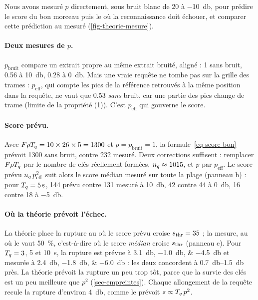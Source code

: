 Nous avons mesuré $p$ directement, sous bruit blanc de 20 à \qty{-10}{\decibel}, pour
prédire le score du bon morceau puis le \RSB{} où la reconnaissance doit échouer, et comparer
cette prédiction au \TBD{} mesuré (\cref{fig-theorie-mesure}).

\paragraph{Deux mesures de $p$.} $p_{\text{bruit}}$ compare un extrait propre au même extrait
bruité, aligné : 1 sans bruit, \num{0.56} à \qty{10}{\decibel}, \num{0.28} à \qty{0}{\decibel}.
Mais une vraie requête ne tombe pas sur la grille des trames : $p_{\text{eff}}$, qui compte
les pics de la référence retrouvés à la même position dans la requête, ne vaut que
\num{0.53} \emph{sans} bruit, car une partie des pics change de trame (limite de la
propriété (1)). C'est $p_{\text{eff}}$ qui gouverne le score.

\paragraph{Score prévu.} Avec $F\rho T_q = 10 \times 26 \times 5 = \num{1300}$ et
$p = p_{\text{bruit}} = 1$, la formule~\eqref{eq-score-bon} prévoit \num{1300} sans bruit,
contre 232 mesuré. Deux corrections suffisent : remplacer $F\rho T_q$ par le nombre de clés
réellement formées, $n_q \approx \num{1015}$, et $p$ par $p_{\text{eff}}$. Le score prévu
$n_q\,p_{\text{eff}}^2$ suit alors le score médian mesuré sur toute la plage (panneau b) : pour
$T_q = \qty{5}{\second}$, 144 prévu contre 131 mesuré à \qty{10}{\decibel}, 42 contre 44 à
\qty{0}{\decibel}, 16 contre 18 à \qty{-5}{\decibel}.

\paragraph{Où la théorie prévoit l'échec.} La théorie place la rupture au \RSB{} où le score
prévu croise $s_{\mathrm{thr}} = 35$ ; la mesure, au \RSB{} où le \TBD{} vaut \qty{50}{\percent},
c'est-à-dire où le score \emph{médian} croise $s_{\mathrm{thr}}$ (panneau c). Pour $T_q = 3$, 5 et
\qty{10}{\second}, la rupture est prévue à \qtylist{3.1;-1.0;-4.5}{\decibel} et mesurée à
\qtylist{2.4;-1.8;-6.0}{\decibel} : les deux concordent à \qtyrange{0.7}{1.5}{\decibel} près.
La théorie prévoit la rupture un peu trop tôt, parce que la survie des clés est un peu
meilleure que $p^2$ (\cref{sec-empreintes}). Chaque allongement de la requête recule la
rupture d'environ \qty{4}{\decibel}, comme le prévoit $s \propto T_q\,p^2$.

